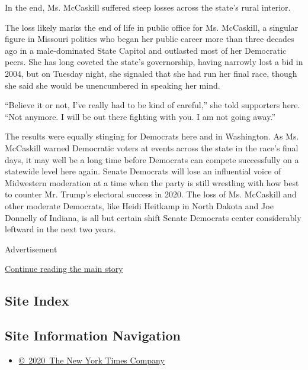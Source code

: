 In the end, Ms. McCaskill suffered steep losses across the state's rural
interior.

The loss likely marks the end of life in public office for Ms.
McCaskill, a singular figure in Missouri politics who began her public
career more than three decades ago in a male-dominated State Capitol and
outlasted most of her Democratic peers. She has long coveted the state's
governorship, having narrowly lost a bid in 2004, but on Tuesday night,
she signaled that she had run her final race, though she said she would
be unencumbered in speaking her mind.

``Believe it or not, I've really had to be kind of careful,'' she told
supporters here. ``Not anymore. I will be out there fighting with you. I
am not going away.''

The results were equally stinging for Democrats here and in Washington.
As Ms. McCaskill warned Democratic voters at events across the state in
the race's final days, it may well be a long time before Democrats can
compete successfully on a statewide level here again. Senate Democrats
will lose an influential voice of Midwestern moderation at a time when
the party is still wrestling with how best to counter Mr. Trump's
electoral success in 2020. The loss of Ms. McCaskill and other moderate
Democrats, like Heidi Heitkamp in North Dakota and Joe Donnelly of
Indiana, is all but certain shift Senate Democrats center considerably
leftward in the next two years.

Advertisement

\protect\hyperlink{after-bottom}{Continue reading the main story}

\hypertarget{site-index}{%
\subsection{Site Index}\label{site-index}}

\hypertarget{site-information-navigation}{%
\subsection{Site Information
Navigation}\label{site-information-navigation}}

\begin{itemize}
\tightlist
\item
  \href{https://help.nytimes.com/hc/en-us/articles/115014792127-Copyright-notice}{©~2020~The
  New York Times Company}
\end{itemize}

